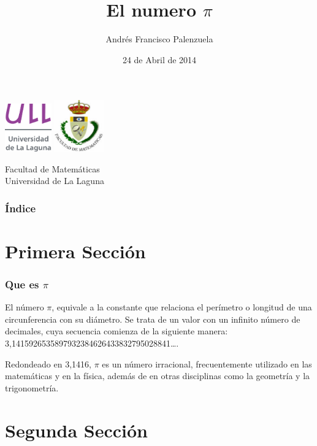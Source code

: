 \documentclass{beamer}
\title[Beamer]{El numero $\pi$}
\author[Técnicas Experimentales]{Andrés Francisco Palenzuela}
\institute{Fac. Mat.}
\date[24-04-2014]{24 de Abril de 2014}
\begin{document}
\begin{frame}

  \includegraphics[width=0.15\textwidth]{img/ullesc.eps}
  \hspace*{7.5cm}
  \includegraphics[width=0.16\textwidth]{img/fmatesc.eps}
\titlepage

  \begin{scriptsize}
    \begin{center}
     Facultad de Matemáticas \\
     Universidad de La Laguna
    \end{center}
  \end{scriptsize}

\end{frame} 


\begin{frame}
  \frametitle{Índice}  
  \tableofcontents[pausesections]
\end{frame}  


\section{Primera Sección}

\begin{frame}

\frametitle{Que es $\pi$}

El número $\pi$, equivale a la constante que relaciona el perímetro o longitud de una circunferencia con su diámetro. Se trata de un valor con un infinito 
número de decimales, cuya secuencia comienza de la siguiente manera: 3,1415926535897932384626433832795028841….\par
Redondeado en 3,1416, $\pi$ es un número irracional, frecuentemente utilizado en las matemáticas y en la física, además de en otras disciplinas como la 
geometría y la trigonometría.

\end{frame}

\section{Segunda Sección}
\end{document}
